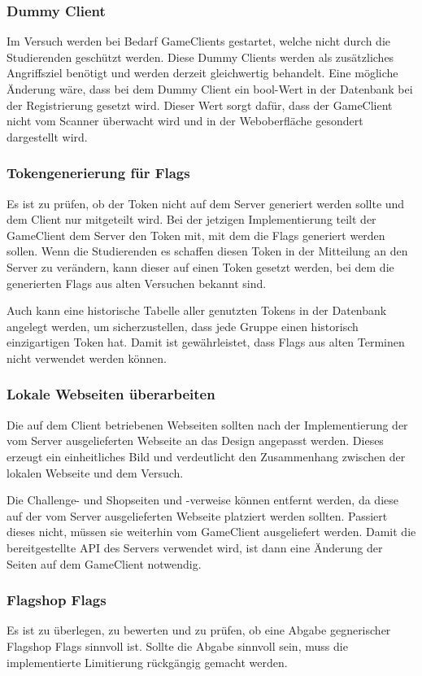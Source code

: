 \subsubsection{Dummy Client}
Im Versuch werden bei Bedarf GameClients gestartet, welche nicht durch die Studierenden geschützt werden. Diese Dummy Clients werden als zusätzliches Angriffsziel benötigt und werden derzeit gleichwertig behandelt. Eine mögliche Änderung wäre, dass bei dem Dummy Client ein bool-Wert in der Datenbank bei der Registrierung gesetzt wird. Dieser Wert sorgt dafür, dass der GameClient nicht vom Scanner überwacht wird und in der Weboberfläche gesondert dargestellt wird.

\subsubsection{Tokengenerierung für Flags}
Es ist zu prüfen, ob der Token nicht auf dem Server generiert werden sollte und dem Client nur mitgeteilt wird. Bei der jetzigen Implementierung teilt der GameClient dem Server den Token mit, mit dem die Flags generiert werden sollen. Wenn die   Studierenden es schaffen diesen Token in der Mitteilung an den Server zu verändern, kann dieser auf einen Token gesetzt werden, bei dem die generierten Flags aus alten Versuchen bekannt sind.

Auch kann eine historische Tabelle aller genutzten Tokens in der Datenbank angelegt werden, um sicherzustellen, dass jede Gruppe einen historisch einzigartigen Token hat. Damit ist gewährleistet, dass Flags aus alten Terminen nicht verwendet werden können.

\subsubsection{Lokale Webseiten überarbeiten}
Die auf dem Client betriebenen Webseiten sollten nach der Implementierung der vom Server ausgelieferten Webseite an das Design angepasst werden. Dieses erzeugt ein einheitliches Bild und verdeutlicht den Zusammenhang zwischen der lokalen Webseite und dem Versuch.

Die Challenge- und Shopseiten und -verweise können entfernt werden, da diese auf der vom Server ausgelieferten Webseite platziert werden sollten. Passiert dieses nicht, müssen sie weiterhin vom GameClient ausgeliefert werden. Damit die bereitgestellte API des Servers verwendet wird, ist dann eine Änderung der Seiten auf dem GameClient notwendig.

\subsubsection{Flagshop Flags}
Es ist zu überlegen, zu bewerten und zu prüfen, ob eine Abgabe gegnerischer Flagshop Flags sinnvoll ist. Sollte die Abgabe sinnvoll sein, muss die implementierte Limitierung rückgängig gemacht werden.